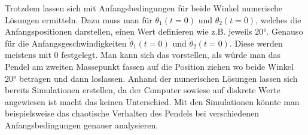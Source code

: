 Trotzdem lassen sich mit Anfangsbedingungen für beide Winkel numerische Lösungen ermitteln.
Dazu muss man für \(\theta_1(t=0)\) und \(\theta_2(t=0)\), welches die Anfangspositionen darstellen,
einen Wert definieren wie z.B. jeweils 20°. Genauso für die Anfangsgeschwindigkeiten \(\dot{\theta}_1(t=0)\)
und \(\dot{\theta}_2(t=0)\).
Diese werden meistens mit 0 festgelegt. Man kann sich das vorstellen, als würde man das Pendel
am zweiten Massepunkt fassen auf die Position ziehen wo beide Winkel 20° betragen und dann loslassen.
Anhand der numerischen Lösungen lassen sich bereits Simulationen erstellen, da der Computer
sowiese auf diskrete Werte angewiesen ist macht das keinen Unterschied.
Mit den Simulationen könnte man beispielsweise das chaotische Verhalten des Pendels bei verschiedenen 
Anfangsbedingungen genauer analysieren.



